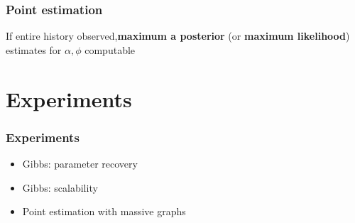\documentclass[final,hyperref={pdfpagelabels=false},noamsthm]{beamer}
\begin{document}
\begin{frame}
	\frametitle{Point estimation}
	If entire history observed,\textbf{maximum a posterior} (or \textbf{maximum likelihood}) estimates for $\alpha, \phi$ computable
\end{frame}

\section{Experiments}
\begin{frame}
	\frametitle{Experiments}
	\begin{itemize}
		\item Gibbs: parameter recovery
		\item Gibbs: scalability
		\item Point estimation with massive graphs
	\end{itemize}
\end{frame}
\end{document}
